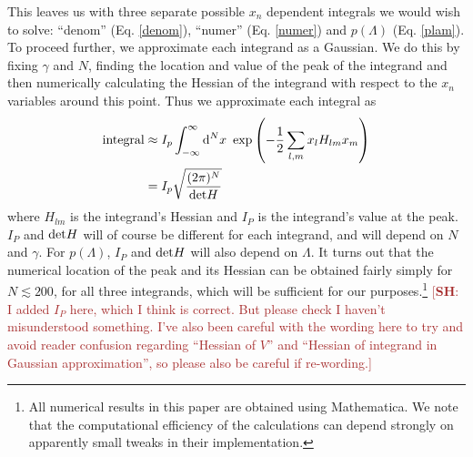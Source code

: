 \documentclass[12pt]{article}
\newcommand{\SH}[1]{\textcolor{brown}{[{\bf SH}: #1]}}
\begin{document}
This leaves us with three separate possible $x_n$ dependent integrals we would wish to solve: ``denom'' (Eq. \ref{denom}), ``numer'' (Eq. \ref{numer}) and $p(\Lambda)$ (Eq. \ref{plam}). To proceed further, we approximate each integrand as a Gaussian. We do this by fixing $\gamma$ and $N$, finding the location and value of the peak of the integrand and then numerically calculating the Hessian of the integrand with respect to the $x_n$ variables around this point. Thus we approximate each integral as
%
\begin{align}\label{Gauss}
\begin{split}
{\rm integral} &\approx I_p\int_{-\infty}^{\infty} {\rm d}^Nx\,\, \exp\left(-\frac{1}{2}\sum_{l,m}x_lH_{lm}x_m\right) \\
&=I_p \sqrt{\frac{(2\pi)^N}{\mathrm{det} H}}
\end{split}
\end{align}
%
\noindent where $H_{lm}$ is the integrand's Hessian and $I_P$ is the integrand's value at the peak. $I_P$ and ${\rm det}H$ will of course be different for each integrand, and will depend on $N$ and $\gamma$. For $p(\Lambda)$, $I_P$ and ${\rm det} H$ will also depend on $\Lambda$. It turns out that the numerical location of the peak and its Hessian can be obtained fairly simply for $N\lesssim 200$, for all three integrands, which will be sufficient for our purposes.\footnote{All numerical results in this paper are obtained using Mathematica. We note that the computational efficiency of the calculations can depend strongly on apparently small tweaks in their implementation.} \SH{I added $I_P$ here, which I think is correct. But please check I haven't misunderstood something. I've also been careful with the wording here to try and avoid reader confusion regarding ``Hessian of $V$'' and ``Hessian of integrand in Gaussian approximation'', so please also be careful if re-wording.}
\end{document}

